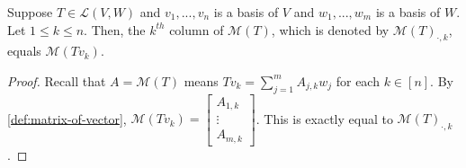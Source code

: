 \documentclass{article}
\begin{document}
\begin{theorem}[$\mathcal{M}(T)_{\cdot, k} = \mathcal{M}(Tv_k)$]
  \label{thm:M(Tv_k)=M(T)_k}
  Suppose $T \in \mathcal{L}(V, W)$ and $v_1, ..., v_n$ is a basis of
  $V$ and $w_1, ..., w_m$ is a basis of $W$. Let $1 \le k \le
  n$. Then, the $k^{th}$ column of $\mathcal{M}(T)$, which is denoted
  by $\mathcal{M}(T)_{\cdot, k}$, equals $\mathcal{M}(Tv_k)$.
\end{theorem}
\begin{proof}
  Recall that $A = \mathcal{M}(T)$ means $Tv_k = \sum_{j=1}^m A_{j, k}
  w_j$ for each $k \in [n]$. By \cref{def:matrix-of-vector},
  $\mathcal{M}(Tv_k) = \begin{bmatrix} A_{1, k} \\ \vdots \\ A_{m,
    k} \end{bmatrix}$. This is exactly equal to
$\mathcal{M}(T)_{\cdot, k}$.
\end{proof}
\end{document}
